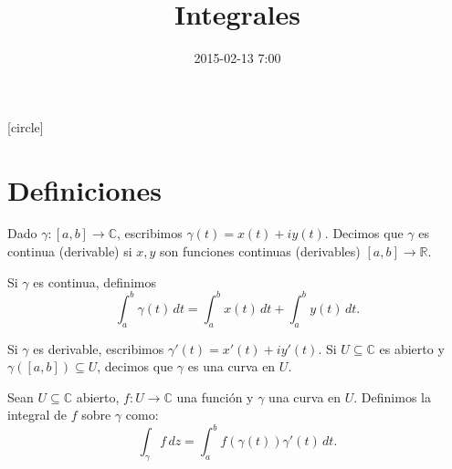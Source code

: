 \documentclass[spanish,presentation]{beamer}
\date{2015-02-13 7:00}
\title{Integrales}
\begin{document}
\maketitle
{}
[circle]

\tableofcontents

\section{Definiciones}
\label{sec-1}

\begin{frame}[label=sec-1-1]{}
\begin{definition}
Dado \(\gamma\colon[a,b]\to \mathbb{C}\), escribimos
\(\gamma(t)=x(t)+iy(t)\). Decimos que \(\gamma\) es continua (derivable) si
\(x,y\) son funciones continuas (derivables) \([a,b]\to
    \mathbb{R}\). 

Si \(\gamma\) es continua, definimos
\begin{displaymath}
\int_{a}^{b}\gamma(t)\,dt=\int_{a}^{b}x(t)\,dt+\int_{a}^{b}y(t)\,dt.
\end{displaymath}

Si \(\gamma\) es derivable, escribimos
\(\gamma'(t)=x'(t)+iy'(t)\). Si \(U\subseteq \mathbb{C}\) es
abierto y \(\gamma([a,b])\subseteq U\), decimos que \(\gamma\) es
una \alert{curva en \(U\)}.
\end{definition}
\end{frame}

\begin{frame}[label=sec-1-2]{}
\begin{definition}
Sean \(U\subseteq \mathbb{C}\) abierto, \(f\colon U\to
    \mathbb{C}\) una función y \(\gamma\) una curva en
\(U\). Definimos la \alert{integral de \(f\) sobre \(\gamma\)} como:
\begin{displaymath}
\int_{\gamma}f\,dz=\int_{a}^{b}f(\gamma(t))\gamma'(t)\,dt.
\end{displaymath}
\end{definition}
\end{frame}
\end{document}
